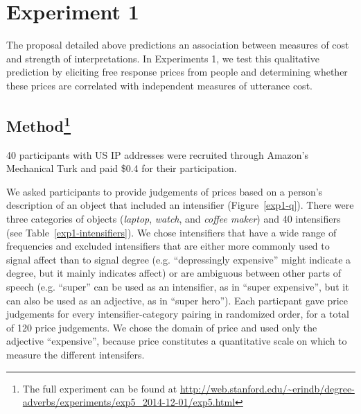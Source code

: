\documentclass[10pt,letterpaper]{article}
\begin{document}
\section{Experiment 1}

The proposal detailed above predictions an association between measures of cost and strength of interpretations. In Experiments 1, we test this qualitative prediction%
by eliciting free response prices from people and determining whether these prices are correlated with independent measures of utterance cost.

\subsection{Method\footnote{The full experiment can be found at \url{http://web.stanford.edu/~erindb/degree-adverbs/experiments/exp5_2014-12-01/exp5.html}}}

40 participants with US IP addresses were recruited through Amazon's Mechanical Turk and paid \$0.4 for their participation.

We asked participants to provide judgements of prices based on a person's description of an object that included an intensifier (Figure~\ref{exp1-q}).
There were three categories of objects (\emph{laptop}, \emph{watch}, and \emph{coffee maker}) and 40 intensifiers (see Table~\ref{exp1-intensifiers}).
We chose intensifiers that have a wide range of frequencies and excluded intensifiers that are either more commonly used to signal affect than to signal degree (e.g. ``depressingly expensive'' might indicate a degree, but it mainly indicates affect) or are ambiguous between other parts of speech (e.g. ``super'' can be used as an intensifier, as in ``super expensive'', but it can also be used as an adjective, as in ``super hero'').
Each particpant gave price judgements for every intensifier-category pairing in randomized order, for a total of 120 price judgements.
We chose the domain of price and used only the adjective ``expensive'', because price constitutes a quantitative scale on which to measure the different intensifers.%
\end{document}
